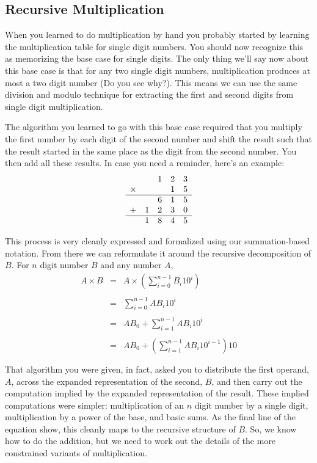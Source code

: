 \documentclass[10pt]{article}
\begin{document}
\subsection*{Recursive Multiplication}

When you learned to do multiplication by hand you probably started by learning the multiplication table for single digit numbers. You should now recognize this as memorizing the base case for single digits. The only thing we'll say now about this base case is that for any two single digit numbers, multiplication produces at most a two digit number (Do you see why?). This means we can use the same division and modulo technique for extracting the first and second digits from single digit multiplication. 

The algorithm you learned to go with this base case required that you multiply the first number by each digit of the second number and shift the result such that the result started in the same place as the digit from the second number. You then add all these results. In case you need a reminder, here's an example:
\[
\begin{array}{lllll}
 & &1&2&3 \\
\times & & &1&5 \\ \hline
 & &6 &1 &5 \\
+ &1 &2 &3 &0 \\ \hline
 &1 &8 &4 &5 
\end{array}
\]

This process is very cleanly expressed and formalized using our summation-based notation. From there we can reformulate it around the recursive decomposition of $B$. For $n$ digit number $B$ and any number $A$,
\[
\begin{array}{rcl}
A \times B &=& A \times \left(\sum\limits_{i=0}^{n-1}B_i10^i \right)\\ \\
 &=& \sum\limits_{i=0}^{n-1}AB_i10^i \\ \\
 &=& AB_0 + \sum\limits_{i=1}^{n-1}AB_i10^i \\ \\ 
 &=& AB_0 + \left(\sum\limits_{i=1}^{n-1}AB_i10^{i-1}\right)10 \\ \\ 
\end{array}
\] 
That algorithm you were given, in fact, asked you to distribute the first operand, $A$, across the expanded representation of the second, $B$, and then carry out the computation implied by the expanded representation of the result. These implied computations were simpler: multiplication of an $n$ digit number by a single digit, multiplication by a power of the base, and basic sums. As the final line of the equation show, this cleanly maps to the recursive structure of $B$. So, we know how to do the addition, but we need to work out the details of the more constrained variants of multiplication. 
\end{document}
